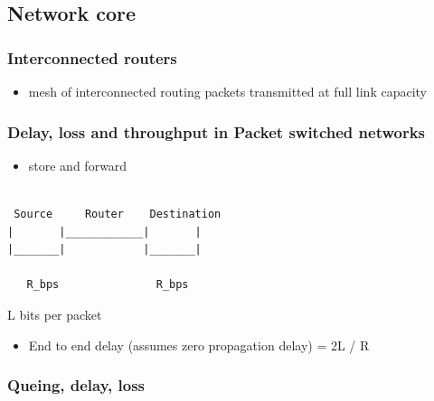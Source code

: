 \documentclass[11pt]{article}
\begin{document}
\subsection{Network core}
\label{sec:org560e402}
\subsubsection{Interconnected routers}
\label{sec:org5b536ca}
\begin{itemize}
\item mesh of interconnected routing packets transmitted at full link
capacity
\end{itemize}

\subsubsection{Delay, loss and throughput in Packet switched networks}
\label{sec:org2534e39}

\begin{itemize}
\item store and forward
\end{itemize}


\begin{verbatim}

 Source     Router    Destination
|       |____________|       |
|_______|            |_______|

   R_bps               R_bps
\end{verbatim}

L bits per packet

\begin{itemize}
\item End to end delay (assumes zero propagation delay) = 2L / R
\end{itemize}

\subsubsection{Queing, delay, loss}
\label{sec:org1a6695c}
\end{document}
